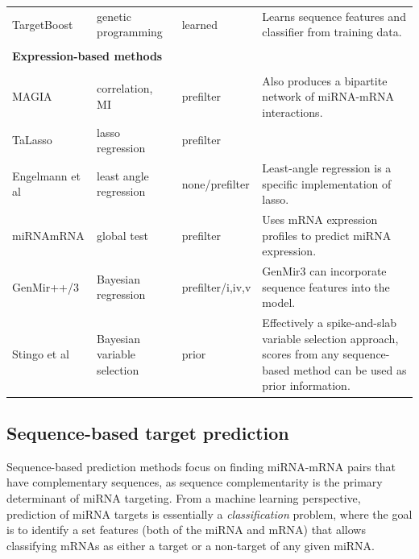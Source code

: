 \begin{table}
{\begin{tabular}{ lp{3cm}lp{5cm} }
    TargetBoost \citep{Saetrom2005} & genetic \mbox{programming} & learned  & Learns sequence features and classifier from training data. \\
    \\
    \multicolumn{4}{l}{\textbf{Expression-based methods}} \\
    \\[-.3cm]
    MAGIA \citep{Sales2010}               & correlation, MI               & prefilter & Also produces a bipartite network of miRNA-mRNA interactions. \\
    TaLasso \citep{Muniategui2012}        & lasso \mbox{regression}       & prefilter &  \\
    Engelmann et al \citep{Engelmann2012} & least angle \mbox{regression} & none/prefilter & Least-angle regression is a specific implementation of lasso. \\
    miRNAmRNA \citep{vanIterson2013}      & global test                   & prefilter   & Uses mRNA expression profiles to predict miRNA expression. \\
    GenMir++/3 \citep{Huang2007,Huang2008}& Bayesian \mbox{regression}    & prefilter/i,iv,v & GenMir3 can incorporate sequence features into the model. \\
    Stingo et al \citep{Stingo2010}       & Bayesian \mbox{variable} \mbox{selection} & prior & Effectively a spike-and-slab variable selection approach, scores from any sequence-based method can be used as prior information. \\
    \hline
    \end{tabular}
    }
\end{table}




\subsection{Sequence-based target prediction}

Sequence-based prediction methods focus on finding miRNA-mRNA pairs that
have complementary sequences, as sequence complementarity
is the primary determinant of miRNA targeting.
From a machine learning perspective,
prediction of miRNA targets is essentially a \emph{classification}
problem, where the goal is to identify a set features (both of the miRNA and
mRNA) that allows classifying mRNAs as either a target or a non-target of any
given miRNA.

